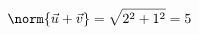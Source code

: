 \documentclass[preview]{standalone}
\begin{document}
\begin{align*}
\norm{\vec{u} + \vec{v}} = \sqrt{2^2 + 1^2} =5
\end{align*}
\end{document}

